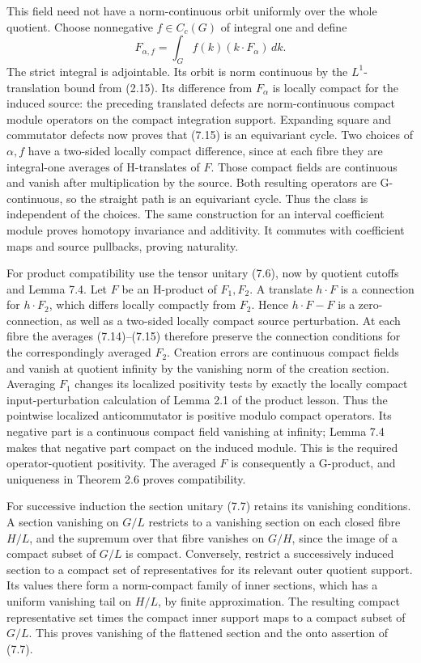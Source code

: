 \documentclass[
  11pt,
]{article}
\begin{document}
This field need not have a norm-continuous orbit uniformly over the
whole quotient. Choose nonnegative \(f\in C_c(G)\) of integral one and
define \[
F_{\alpha,f}=\int_G f(k)(k\cdot F_\alpha)\,dk.
\tag{7.15}
\] The strict integral is adjointable. Its orbit is norm continuous by
the \(L^1\)-translation bound from (2.15). Its difference from
\(F_\alpha\) is locally compact for the induced source: the preceding
translated defects are norm-continuous compact module operators on the
compact integration support. Expanding square and commutator defects now
proves that (7.15) is an equivariant cycle. Two choices of \(\alpha,f\)
have a two-sided locally compact difference, since at each fibre they
are integral-one averages of H-translates of \(F\). Those compact fields
are continuous and vanish after multiplication by the source. Both
resulting operators are G-continuous, so the straight path is an
equivariant cycle. Thus the class is independent of the choices. The
same construction for an interval coefficient module proves homotopy
invariance and additivity. It commutes with coefficient maps and source
pullbacks, proving naturality.

For product compatibility use the tensor unitary (7.6), now by quotient
cutoffs and Lemma 7.4. Let \(F\) be an H-product of \(F_1,F_2\). A
translate \(h\cdot F\) is a connection for \(h\cdot F_2\), which differs
locally compactly from \(F_2\). Hence \(h\cdot F-F\) is a
zero-connection, as well as a two-sided locally compact source
perturbation. At each fibre the averages (7.14)--(7.15) therefore
preserve the connection conditions for the correspondingly averaged
\(F_2\). Creation errors are continuous compact fields and vanish at
quotient infinity by the vanishing norm of the creation section.
Averaging \(F_1\) changes its localized positivity tests by exactly the
locally compact input-perturbation calculation of Lemma 2.1 of the
product lesson. Thus the pointwise localized anticommutator is positive
modulo compact operators. Its negative part is a continuous compact
field vanishing at infinity; Lemma 7.4 makes that negative part compact
on the induced module. This is the required operator-quotient
positivity. The averaged \(F\) is consequently a G-product, and
uniqueness in Theorem 2.6 proves compatibility.

For successive induction the section unitary (7.7) retains its vanishing
conditions. A section vanishing on \(G/L\) restricts to a vanishing
section on each closed fibre \(H/L\), and the supremum over that fibre
vanishes on \(G/H\), since the image of a compact subset of \(G/L\) is
compact. Conversely, restrict a successively induced section to a
compact set of representatives for its relevant outer quotient support.
Its values there form a norm-compact family of inner sections, which has
a uniform vanishing tail on \(H/L\), by finite approximation. The
resulting compact representative set times the compact inner support
maps to a compact subset of \(G/L\). This proves vanishing of the
flattened section and the onto assertion of (7.7).
\end{document}
